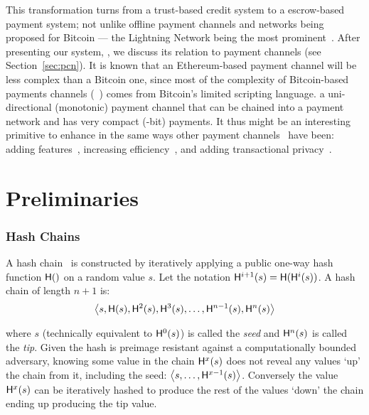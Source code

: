 This transformation turns \pw from a trust-based credit system to a escrow-based payment system; not unlike offline payment channels and networks being proposed for Bitcoin --- the Lightning Network being the most prominent~\cite{PD15}. After presenting our system, \ew, we discuss its relation to payment channels (see Section~\ref{sec:pcn}). It is known that an Ethereum-based payment channel will be less complex than a Bitcoin one, since most of the complexity of Bitcoin-based payments channels (\eg {}~\cite{MMSH16}) comes from Bitcoin's limited scripting language. \ew a uni-directional (monotonic) payment channel that can be chained into a payment network and has very compact (-bit) payments. It thus might be an interesting primitive to enhance in the same ways other payment channels~\cite{DW15,PD15} have been: adding features~\cite{KG17}, increasing efficiency~\cite{DEFM17,MBKM17}, and adding transactional privacy~\cite{GM17,MMK+17,HAB+17,RMKG18}.


\section{Preliminaries}

\subsubsection{Hash Chains}

A hash chain~\cite{Lam81} is constructed by iteratively applying a public one-way hash function $\mathsf{H}()$ on a random value $s$. Let the notation $\mathsf{H}^{i+1}(s) = \mathsf{H}(\mathsf{H}^{i}(s))$. A hash chain of length $n+1$ is:
\begin{equation*} \left \langle s,\mathsf{H}(s),\mathsf{H}^{2}(s),\mathsf{H}^{3}(s),\ldots,\mathsf{H}^{n-1}(s),\mathsf{H}^{n}(s) \right \rangle \end{equation*}

where $s$ (technically equivalent to $\mathsf{H}^{0}(s)$) is called the \textit{seed} and $\mathsf{H}^{n}(s)$ is called the \textit{tip}. Given the hash is preimage resistant against a computationally bounded adversary, knowing some value in the chain $\mathsf{H}^{x}(s)$ does not reveal any values `up' the chain from it, including the seed: $\left \langle s,\ldots,\mathsf{H}^{x-1}(s) \right \rangle$. Conversely the value $\mathsf{H}^{x}(s)$ can be iteratively hashed to produce the rest of the values `down' the chain ending up producing the tip value. 

